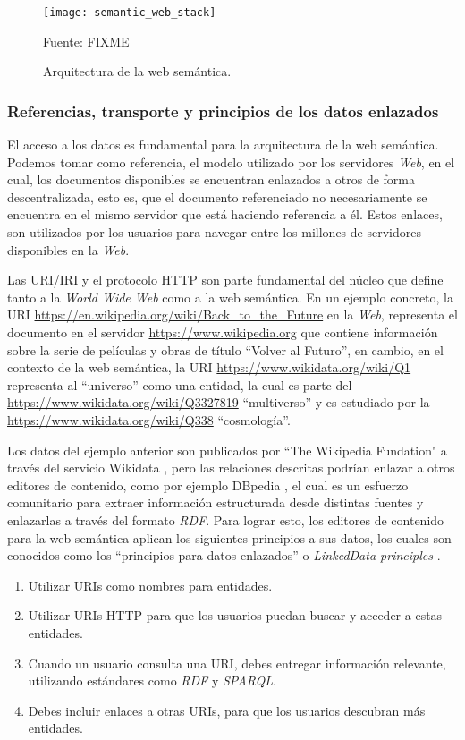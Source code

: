 \begin{figure}
    \centering
    \texttt{[image: semantic\_web\_stack]}
    \caption{Arquitectura de la web semántica.} Fuente: FIXME
    \label{fig:semantic-web-arq}
\end{figure}

\subsubsection{Referencias, transporte y principios de los datos enlazados}

El acceso a los datos es fundamental para la arquitectura de la web semántica.
Podemos tomar como referencia, el modelo utilizado por los servidores
\textit{Web}, en el cual, los documentos disponibles se encuentran enlazados a
otros de forma descentralizada, esto es, que el documento referenciado no
necesariamente se encuentra en el mismo servidor que está haciendo referencia a
él. Estos enlaces, son utilizados por los usuarios para navegar entre los
millones de servidores disponibles en la \textit{Web}.

Las URI/IRI y el protocolo HTTP son parte fundamental del núcleo que define
tanto a la \textit{World Wide Web} como a la web semántica. En un ejemplo
concreto, la URI \url{https://en.wikipedia.org/wiki/Back_to_the_Future} en la
\textit{Web}, representa el documento en el servidor
\url{https://www.wikipedia.org} que contiene información sobre la serie de
películas y obras de título ``Volver al Futuro'', en cambio, en el contexto de
la web semántica, la URI \url{https://www.wikidata.org/wiki/Q1} representa al
``universo'' como una entidad, la cual es parte del
\url{https://www.wikidata.org/wiki/Q3327819} ``multiverso'' y es estudiado por
la \url{https://www.wikidata.org/wiki/Q338} ``cosmología''.

Los datos del ejemplo anterior son publicados por ``The Wikipedia Fundation" a
través del servicio Wikidata \cite{vrandevcic2014wikidata}, pero las relaciones
descritas podrían enlazar a otros editores de contenido, como por ejemplo
DBpedia \cite{valsecchi2015dbpedia}, el cual es un esfuerzo comunitario para
extraer información estructurada desde distintas fuentes y enlazarlas a través
del formato \textit{RDF}. Para lograr esto, los editores de contenido para la
web semántica aplican los siguientes principios a sus datos, los cuales son
conocidos como los ``principios para datos enlazados'' o \textit{LinkedData
principles} \cite{bizer2011linked}.

\begin{enumerate}
    \item Utilizar URIs como nombres para entidades.
    \item Utilizar URIs HTTP para que los usuarios puedan buscar y acceder a
    estas entidades.
    \item Cuando un usuario consulta una URI, debes entregar información
    relevante, utilizando estándares como \textit{RDF} y \textit{SPARQL}.
    \item Debes incluir enlaces a otras URIs, para que los usuarios descubran
    más entidades.
\end{enumerate}

